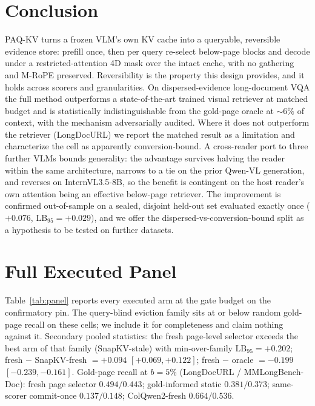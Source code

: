 \documentclass[letterpaper]{article} %
\newcommand{\paqc}{\textsc{PAQ-KV}}
\newcommand{\lb}{\mathrm{LB}_{95}}
\begin{document}
\section{Conclusion}
\paqc{} turns a frozen VLM's own KV cache into a queryable, reversible evidence store: prefill once, then per query re-select below-page blocks and decode under a restricted-attention 4D mask over the intact cache, with no gathering and M-RoPE preserved. Reversibility is the property this design provides, and it holds across scorers and granularities. On dispersed-evidence long-document VQA the full method outperforms a state-of-the-art trained visual retriever at matched budget and is statistically indistinguishable from the gold-page oracle at ${\sim}6\%$ of context, with the mechanism adversarially audited. Where it does not outperform the retriever (LongDocURL) we report the matched result as a limitation and characterize the cell as apparently conversion-bound. A cross-reader port to three further VLMs bounds generality: the advantage survives halving the reader within the same architecture, narrows to a tie on the prior Qwen-VL generation, and reverses on InternVL3.5-8B, so the benefit is contingent on the host reader's own attention being an effective below-page retriever. The improvement is confirmed out-of-sample on a sealed, disjoint held-out set evaluated exactly once ($+0.076$, $\lb=+0.029$), and we offer the dispersed-vs-conversion-bound split as a hypothesis to be tested on further datasets.



\appendix

\section{Full Executed Panel}\label{app:panel}

Table~\ref{tab:panel} reports every executed arm at the gate budget on the confirmatory pin. The query-blind eviction family sits at or below random gold-page recall on these cells; we include it for completeness and claim nothing against it. Secondary pooled statistics: the fresh page-level selector exceeds the best arm of that family (SnapKV-stale) with min-over-family $\lb = +0.202$; fresh $-$ SnapKV-fresh $= +0.094$ $[+0.069,+0.122]$; fresh $-$ oracle $= -0.199$ $[-0.239,-0.161]$. Gold-page recall at $b{=}5\%$ (LongDocURL / MMLongBench-Doc): fresh page selector $0.494/0.443$; gold-informed static $0.381/0.373$; same-scorer commit-once $0.137/0.148$; ColQwen2-fresh $0.664/0.536$.
\end{document}
